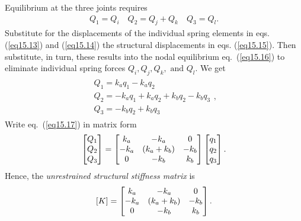 \documentclass{AeroStructure-ERJohnson}
\begin{document}
\noindent Equilibrium at the three joints requires
\begin{align}\label{eq15.16}
Q_{1}=Q_{i} \quad Q_{2}=Q_{j}+Q_{k} \quad Q_{3}=Q_{l}.
\end{align}
Substitute for the displacements of the individual spring elements in eqs. (\ref{eq15.13}) and (\ref{eq15.14}) the structural displacements in eqs. (\ref{eq15.15}). Then substitute, in turn, these results into the nodal equilibrium eq.~(\ref{eq15.16}) to eliminate individual spring forces $Q_{i}, Q_{j}, Q_{k}, \text{ and } Q_{l}$. We\vspace*{-3pt} get
\begin{align}\label{eq15.17}
\begin{gathered}Q_{1}=k_{a} q_{1}-k_{a} q_{2} \\Q_{2}=-k_{a} q_{1}+k_{a} q_{2}+k_{b} q_{2}-k_{b} q_{3} \\Q_{3}=-k_{b} q_{2}+k_{b} q_{3}\end{gathered},
\end{align}
Write eq.~(\ref{eq15.17}) in matrix\vspace*{-3pt} form
\begin{align}\label{eq15.18}
\left[\begin{array}{@{}l@{}}Q_{1} \\Q_{2} \\Q_{3}\end{array}\right]=\left[\begin{array}{@{}ccc@{}}k_{a} & -k_{a} & 0 \\ -k_{a} & (k_{a}+k_{b}) & -k_{b} \\ 0 & -k_{b} & k_{b}\end{array}\right]\left[\begin{array}{@{}l@{}}q_{1} \\q_{2} \\q_{3}\end{array}\right].
\end{align}
Hence, the \textit{unrestrained structural stiffness matrix}\vspace*{-3pt} is
\begin{align}\label{eq15.19}
[K]=\left[\begin{array}{@{}ccc@{}}k_{a} & -k_{a} & 0 \\ -k_{a} & (k_{a}+k_{b}) & -k_{b} \\0 & -k_{b} & k_{b}\end{array}\right].
\end{align}

\removelastskip
\end{document}
